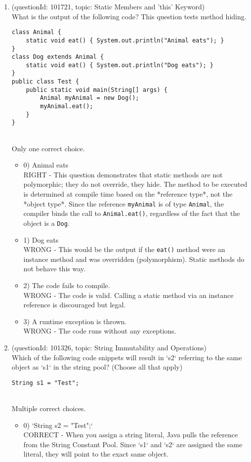 \documentclass[12pt]{article}
\begin{document}
\begin{enumerate}[label=(\arabic*)]
\begin{itemize}
\end{itemize}
\item (questionId: 101721, topic: Static Members and 'this' Keyword) \\ 
What is the output of the following code? This question tests method hiding.\n\begin{verbatim}
class Animal {
    static void eat() { System.out.println("Animal eats"); }
}
class Dog extends Animal {
    static void eat() { System.out.println("Dog eats"); }
}
public class Test {
    public static void main(String[] args) {
        Animal myAnimal = new Dog();
        myAnimal.eat();
    }
}
\end{verbatim}
\\ \noindent Only one correct choice. 
\begin{itemize}
\item 0) Animal eats
 \\ 
RIGHT - This question demonstrates that static methods are not polymorphic; they do not override, they hide. The method to be executed is determined at compile time based on the *reference type*, not the *object type*. Since the reference \verb|myAnimal| is of type \verb|Animal|, the compiler binds the call to \verb|Animal.eat()|, regardless of the fact that the object is a \verb|Dog|.

\item 1) Dog eats
 \\ 
WRONG - This would be the output if the \verb|eat()| method were an instance method and was overridden (polymorphism). Static methods do not behave this way.

\item 2) The code fails to compile.
 \\ 
WRONG - The code is valid. Calling a static method via an instance reference is discouraged but legal.

\item 3) A runtime exception is thrown.
 \\ 
WRONG - The code runs without any exceptions.

\end{itemize}
\item (questionId: 101326, topic: String Immutability and Operations) \\ 
Which of the following code snippets will result in `s2` referring to the same object as `s1` in the string pool? (Choose all that apply)
\begin{verbatim}
String s1 = "Test";
\end{verbatim}
\\ \noindent Multiple correct choices. 
\begin{itemize}
\item 0) `String s2 = "Test";`
 \\ 
CORRECT - When you assign a string literal, Java pulls the reference from the String Constant Pool. Since `s1` and `s2` are assigned the same literal, they will point to the exact same object.


\end{itemize}
\end{enumerate}
\end{document}
